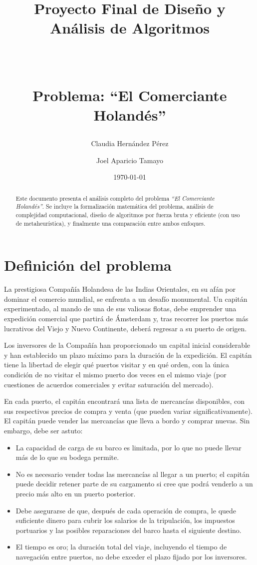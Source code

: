 \documentclass[12pt, a4paper]{article}
\title{Proyecto Final de Diseño y Análisis de Algoritmos

\

\large Problema: ``El Comerciante Holandés''}
\author{Claudia Hernández Pérez \and Joel Aparicio Tamayo}
\date{\today}
\begin{document}
\maketitle

\begin{abstract}
Este documento presenta el análisis completo del problema \emph{``El Comerciante Holandés''}. Se incluye la formalización matemática del problema, análisis de complejidad computacional, diseño de algoritmos por fuerza bruta y eficiente (con uso de metaheurística), y finalmente una comparación entre ambos enfoques. 
\end{abstract}

\section{Definición del problema}

La prestigiosa Compañía Holandesa de las Indias Orientales, en su afán por dominar el comercio mundial, se enfrenta a un desafío monumental. Un capitán experimentado, al mando de una de sus valiosas flotas, debe emprender una expedición comercial que partirá de Ámsterdam y, tras recorrer los puertos más lucrativos del Viejo y Nuevo Continente, deberá regresar a su puerto de origen.

Los inversores de la Compañía han proporcionado un capital inicial considerable y han establecido un plazo máximo para la duración de la expedición. El capitán tiene la libertad de elegir qué puertos visitar y en qué orden, con la única condición de no visitar el mismo puerto dos veces en el mismo viaje (por cuestiones de acuerdos comerciales y evitar saturación del mercado).

En cada puerto, el capitán encontrará una lista de mercancías disponibles, con sus respectivos precios de compra y venta (que pueden variar significativamente). El capitán puede vender las mercancías que lleva a bordo y comprar nuevas. Sin embargo, debe ser astuto:

\begin{itemize}
    \item La capacidad de carga de su barco es limitada, por lo que no puede llevar más de lo que su bodega permite.
    \item No es necesario vender todas las mercancías al llegar a un puerto; el capitán puede decidir retener parte de su cargamento si cree que podrá venderlo a un precio más alto en un puerto posterior.
    \item Debe asegurarse de que, después de cada operación de compra, le quede suficiente dinero para cubrir los salarios de la tripulación, los impuestos portuarios y las posibles reparaciones del barco hasta el siguiente destino.
    \item El tiempo es oro; la duración total del viaje, incluyendo el tiempo de navegación entre puertos, no debe exceder el plazo fijado por los inversores.
\end{itemize}
\end{document}

